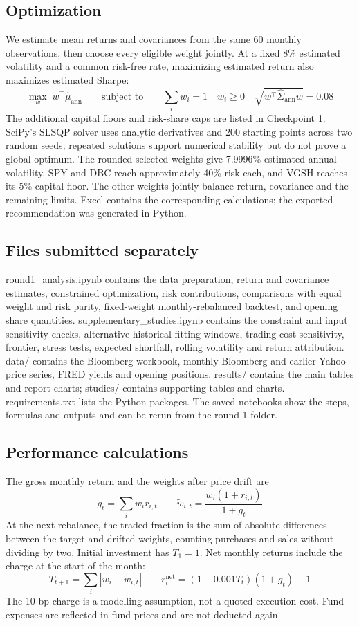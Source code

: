 \documentclass[10pt,a4paper]{article}
\begin{document}
\subsection{Optimization}
We estimate mean returns and covariances from the same 60 monthly observations, then choose every eligible weight jointly. At a fixed 8\% estimated volatility and a common risk-free rate, maximizing estimated return also maximizes estimated Sharpe:
\[
\max_w\;w^\top\widehat\mu_{\mathrm{ann}}
\qquad\text{subject to}\qquad
\sum_i w_i=1\quad w_i\geq0\quad
\sqrt{w^\top\widehat\Sigma_{\mathrm{ann}}w}=0.08
\] The additional capital floors and risk-share caps are listed in Checkpoint 1. SciPy’s SLSQP solver uses analytic derivatives and 200 starting points across two random seeds; repeated solutions support numerical stability but do not prove a global optimum. The rounded selected weights give 7.9996\% estimated annual volatility. SPY and DBC reach approximately 40\% risk each, and VGSH reaches its 5\% capital floor. The other weights jointly balance return, covariance and the remaining limits. Excel contains the corresponding calculations; the exported recommendation was generated in Python.

\subsection{Files submitted separately}
{\raggedright
round1\_analysis.ipynb contains the data preparation, return and covariance estimates, constrained optimization, risk contributions, comparisons with equal weight and risk parity, fixed-weight monthly-rebalanced backtest, and opening share quantities. supplementary\_studies.ipynb contains the constraint and input sensitivity checks, alternative historical fitting windows, trading-cost sensitivity, frontier, stress tests, expected shortfall, rolling volatility and return attribution. data/ contains the Bloomberg workbook, monthly Bloomberg and earlier Yahoo price series, FRED yields and opening positions. results/ contains the main tables and report charts; studies/ contains supporting tables and charts. requirements.txt lists the Python packages. The saved notebooks show the steps, formulas and outputs and can be rerun from the round-1 folder.\par}

\subsection{Performance calculations}
The gross monthly return and the weights after price drift are
\[
g_t=\sum_i w_i r_{i,t}\qquad\widetilde w_{i,t}=\frac{w_i(1+r_{i,t})}{1+g_t}
\]
At the next rebalance, the traded fraction is the sum of absolute differences between the target and drifted weights, counting purchases and sales without dividing by two. Initial investment has $T_1=1$. Net monthly returns include the charge at the start of the month:
\[
T_{t+1}=\sum_i\left|w_i-\widetilde w_{i,t}\right|\qquad r^{\mathrm{net}}_t=(1-0.001T_t)(1+g_t)-1
\]
The 10 bp charge is a modelling assumption, not a quoted execution cost. Fund expenses are reflected in fund prices and are not deducted again.
\end{document}
